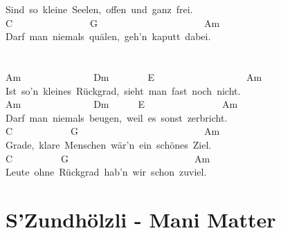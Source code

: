 \documentclass[]{book}
\let\stdsection\section
\renewcommand\section{\clearpage\stdsection}
\begin{document}
Sind~so~kleine~Seelen,~offen~und~ganz~frei.\\
C~~~~~~~~~~~~~~~~G~~~~~~~~~~~~~~~~~~~~~~Am\\
Darf~man~niemals~quälen,~geh'n~kaputt~dabei.\\
~\\
~\\
Am~~~~~~~~~~~~~~~Dm~~~~~~~~E~~~~~~~~~~~~~~~~~~~Am\\
Ist~so'n~kleines~Rückgrad,~sieht~man~fast~noch~nicht.\\
Am~~~~~~~~~~~~~~~Dm~~~~~~E~~~~~~~~~~~~~~~~Am\\
Darf~man~niemals~beugen,~weil~es~sonst~zerbricht.\\
C~~~~~~~~~~~~G~~~~~~~~~~~~~~~~~~~~~~~~~~Am\\
Grade,~klare~Menschen~wär'n~ein~schönes~Ziel.\\
C~~~~~~~~~~G~~~~~~~~~~~~~~~~~~~~~~~~~~Am\\
Leute~ohne~Rückgrad~hab'n~wir~schon~zuviel.\\

\hypertarget{szundholzli---mani-matter}{%
\section{S'Zundhölzli - Mani Matter}\label{szundholzli---mani-matter}}
\end{document}
